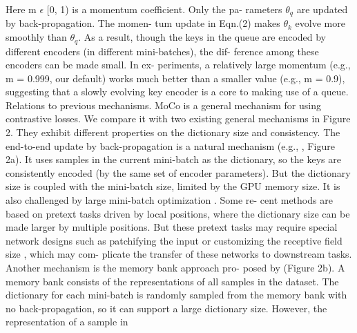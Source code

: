 \documentclass[10pt,twocolumn]{article}  %
\begin{document}
Here m $\epsilon$ [0, 1) is a momentum coefficient. Only the pa-
rameters $\theta_q$ are updated by back-propagation. The momen-
tum update in Eqn.(2) makes $\theta_k$ evolve more smoothly than
$\theta_q$. As a result, though the keys in the queue are encoded
by different encoders (in different mini-batches), the dif-
ference among these encoders can be made small. In ex-
periments, a relatively large momentum (e.g., m = 0.999,
our default) works much better than a smaller value (e.g.,
m = 0.9), suggesting that a slowly evolving key encoder is
a core to making use of a queue.
Relations to previous mechanisms. MoCo is a general
mechanism for using contrastive losses. We compare it with
two existing general mechanisms in Figure 2. They exhibit
different properties on the dictionary size and consistency.
The end-to-end update by back-propagation is a natural
mechanism (e.g., \cite{29_hadsell2006dimensionality, 46_oord2018representation, 36_hjelm2019learning, 63_he2019momentum, 2_bachman2019learning, 35_henaff2019data}, Figure 2a). It uses
samples in the current mini-batch as the dictionary, so the
keys are consistently encoded (by the same set of encoder
parameters). But the dictionary size is coupled with the
mini-batch size, limited by the GPU memory size. It is also
challenged by large mini-batch optimization \cite{25_goyal2017accurate}. Some re-
cent methods \cite{46_oord2018representation, 36_hjelm2019learning, 2_bachman2019learning} are based on pretext tasks driven by
local positions, where the dictionary size can be made larger
by multiple positions. But these pretext tasks may require
special network designs such as patchifying the input \cite{46_oord2018representation}
or customizing the receptive field size \cite{2_bachman2019learning}, which may com-
plicate the transfer of these networks to downstream tasks.
Another mechanism is the memory bank approach pro-
posed by \cite{61_wu2018unsupervised} (Figure 2b). A memory bank consists of the
representations of all samples in the dataset. The dictionary
for each mini-batch is randomly sampled from the memory
bank with no back-propagation, so it can support a large
dictionary size. However, the representation of a sample in
\end{document}
